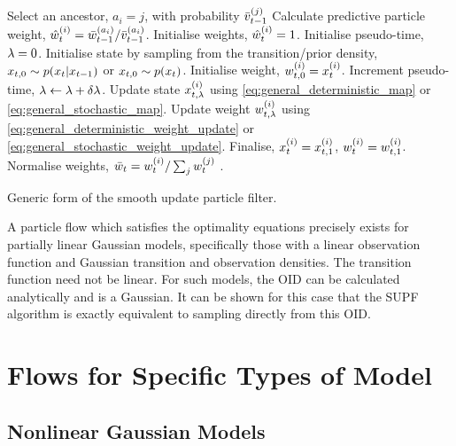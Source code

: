 \documentclass{statsoc}
\begin{document}
\begin{algorithm} \label{alg:general_SUPF}
\begin{algorithmic}[1]
        \STATE Select an ancestor, $a_i=j$, with probability $\bar{v}_{t-1}^{(j)}$
        \STATE Calculate predictive particle weight, $\hat{w}_{t}^{(i)} = \bar{w}_{t-1}^{(a_i)} / \bar{v}_{t-1}^{(a_i)}$.
      \ELSE
        \STATE Initialise weights, $\hat{w}_{t}^{(i)} = 1$.
      \ENDIF
      \STATE Initialise pseudo-time, $\lambda=0$.
      \STATE Initialise state by sampling from the transition/prior density, $x_{t,0} \sim p(x_{t} | x_{t-1})$ or $x_{t,0} \sim p(x_{t})$.
      \STATE Initialise weight, $w_{t,0}^{(i)} = x_{t}^{(i)}$.
        \STATE Increment pseudo-time, $\lambda \leftarrow \lambda+\delta\lambda$.
        \STATE Update state $x_{t,\lambda}^{(i)}$ using \eqref{eq:general_deterministic_map} or \eqref{eq:general_stochastic_map}.
        \STATE Update weight $w_{t,\lambda}^{(i)}$ using \eqref{eq:general_deterministic_weight_update} or \eqref{eq:general_stochastic_weight_update}.
      \ENDWHILE
      \STATE Finalise, $x_{t}^{(i)} = x_{t,1}^{(i)}$, $w_{t}^{(i)} = w_{t,1}^{(i)}$.
    \ENDFOR
    \STATE Normalise weights, $\bar{w}_{t} = w_{t}^{(i)} / \sum_j w_{t}^{(j)}$ .
  \ENDFOR
\end{algorithmic}
\caption{Generic form of the smooth update particle filter.}
\end{algorithm}

A particle flow which satisfies the optimality equations precisely exists for partially linear Gaussian models, specifically those with a linear observation function and Gaussian transition and observation densities. The transition function need not be linear. For such models, the OID can be calculated analytically and is a Gaussian. It can be shown for this case that the SUPF algorithm is exactly equivalent to sampling directly from this OID.



\section{Flows for Specific Types of Model}

\subsection{Nonlinear Gaussian Models}
\end{document}
